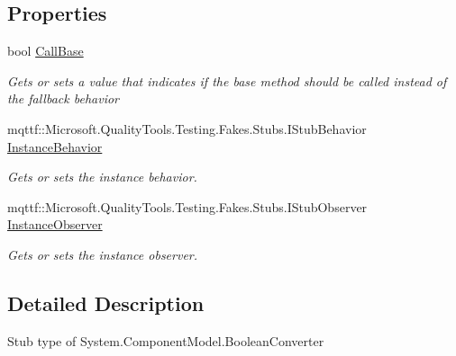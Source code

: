 \subsection*{Properties}
\begin{DoxyCompactItemize}
\item 
bool \hyperlink{class_system_1_1_component_model_1_1_fakes_1_1_stub_boolean_converter_a40e24043ab02a1d6fbdba953f12c9279}{Call\-Base}
\begin{DoxyCompactList}\small\item\em Gets or sets a value that indicates if the base method should be called instead of the fallback behavior\end{DoxyCompactList}\item 
mqttf\-::\-Microsoft.\-Quality\-Tools.\-Testing.\-Fakes.\-Stubs.\-I\-Stub\-Behavior \hyperlink{class_system_1_1_component_model_1_1_fakes_1_1_stub_boolean_converter_aa669bf9b894fa9c263eb838c771b92db}{Instance\-Behavior}
\begin{DoxyCompactList}\small\item\em Gets or sets the instance behavior.\end{DoxyCompactList}\item 
mqttf\-::\-Microsoft.\-Quality\-Tools.\-Testing.\-Fakes.\-Stubs.\-I\-Stub\-Observer \hyperlink{class_system_1_1_component_model_1_1_fakes_1_1_stub_boolean_converter_a6fa250130a928bee9340aab21c005c31}{Instance\-Observer}
\begin{DoxyCompactList}\small\item\em Gets or sets the instance observer.\end{DoxyCompactList}\end{DoxyCompactItemize}


\subsection{Detailed Description}
Stub type of System.\-Component\-Model.\-Boolean\-Converter



